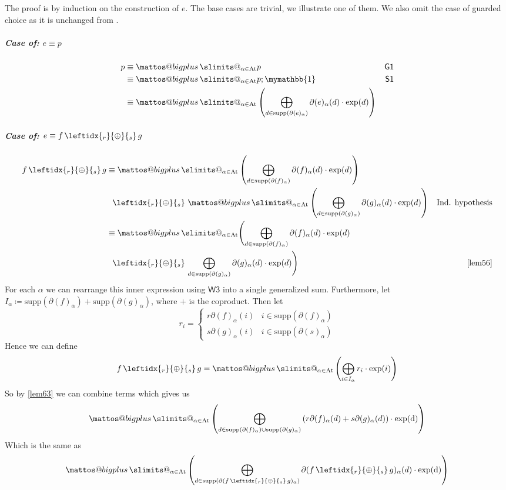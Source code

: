 \documentclass[a4paper,UKenglish,cleveref, autoref, thm-restate]{lipics-v2021}
\makeatletter
\newcommand{\At}{\text{\upshape{At}}}
\newcommand{\WC}[2]{\,\leftidx{_{#1}}{{\oplus}}{_{#2}}\,}
\newcommand{\Ax}[1]{\ensuremath{\mathsf{#1}}}
\newcommand{\bskip}{\mymathbb{1}}
\newcommand{\probgkat}{\textsf{\upshape{ProbGKAT}}\xspace}
\theoremstyle{plain}\newtheoremrep{thm}{Theorem}[section]
\newcommand{\bigplus}{\DOTSB\mathop{\mathpalette\mattos@bigplus\relax}\slimits@
}
\newcommand\mattos@bigplus[2]{\vcenter{\hbox{\sbox\z@{$#1\sum$}\resizebox{!}{0.9\dimexpr\ht\z@+\dp\z@}{\raisebox{\depth}{$\m@th#1+$}}}}\vphantom{\sum}}
\makeatother
\begin{document}
	\begin{appendixproof}
	The proof is by induction on the construction of $e$. The base cases are trivial, we illustrate one of them. We also omit the case of guarded choice as it is unchanged from \probgkat \cite{rozowski2023probabilistic}.
	\subparagraph*{Case of: $e\equiv p$}
	\begin{align*}
		p &\equiv \bigplus_{\alpha \in \At} p & \Ax{G1}\\
		&\equiv \bigplus_{\alpha \in \At} p;\bskip & \Ax{S1}\\
		&\equiv \bigplus_{\alpha \in \At}\left(\bigoplus_{d \in \text{supp}(\partial(e)_\alpha)} \partial(e )_\alpha(d)\cdot \text{exp}(d)\right) &
	\end{align*}
	\subparagraph*{Case of: $e \equiv f \WC{r}{s} g$}
	\begin{align*}
		f \WC{r}{s} g &\equiv \bigplus_{\alpha \in \At} \left(\bigoplus_{d \in \text{supp}(\partial(f)_\alpha)}\partial(f)_\alpha(d) \cdot \text{exp}(d)\right) \\&\;\;\WC{r}{s} \bigplus_{\alpha \in \At} \left(\bigoplus_{d \in \text{supp}(\partial(g)_\alpha)}\partial(g)_\alpha(d) \cdot \text{exp}(d)\right)& \text{Ind. hypothesis}\\
		&\equiv\bigplus_{\alpha \in \At} \Biggl( \bigoplus_{d \in \text{supp}(\partial(f)_\alpha)}\partial(f)_\alpha(d) \cdot \text{exp}(d)\\&\;\; \WC{r}{s} \bigoplus_{d \in \text{supp}(\partial(g)_\alpha)}\partial(g)_\alpha(d) \cdot \text{exp}(d)\Biggl)& \cref{lem56}
	\end{align*}
	For each $\alpha$ we can rearrange this inner expression using \Ax{W3} into a single generalized sum. Furthermore, let $I_\alpha \coloneq \text{supp}(\partial(f)_\alpha) + \text{supp}(\partial(g)_\alpha)$, where $+$ is the coproduct. Then let $$r_i = \begin{cases}
		r\partial(f)_\alpha(i)& i \in \text{supp}(\partial(f)_\alpha)\\s\partial(g)_\alpha(i)& i \in \text{supp}(\partial(s)_\alpha)
	\end{cases}$$
	Hence we can define $$f \WC{r}{s} g = \bigplus_{\alpha \in \At}\left(\bigoplus_{i\in I_\alpha} r_i\cdot \text{exp}(i)\right)$$
	So by \cref{lem63} we can combine terms which gives us
	$$\bigplus_{\alpha \in \At}\left(\bigoplus_{d \in \text{supp}(\partial(f)_\alpha) \cup \text{supp}(\partial(g)_\alpha)} \left(r\partial(f)_\alpha(d) + s\partial(g)_\alpha(d)\right)\cdot \text{exp(d)}\right)$$
	Which is the same as
	$$\bigplus_{\alpha \in \At}\left(\bigoplus_{d \in \text{supp}(\partial(f \WC{r}{s} g)_\alpha)} \partial(f \WC{r}{s} g)_\alpha(d)\cdot \text{exp(d)}\right)$$
	

\end{appendixproof}
\end{document}
